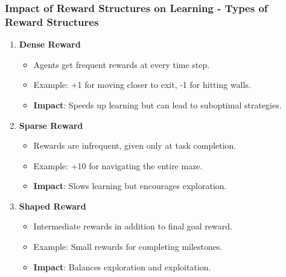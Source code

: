 \documentclass[aspectratio=169]{beamer}
\begin{document}
\begin{frame}[fragile]
    \frametitle{Impact of Reward Structures on Learning - Types of Reward Structures}
    \begin{enumerate}
        \item \textbf{Dense Reward}
        \begin{itemize}
            \item Agents get frequent rewards at every time step.
            \item Example: +1 for moving closer to exit, -1 for hitting walls.
            \item \textbf{Impact}: Speeds up learning but can lead to suboptimal strategies.
        \end{itemize}
        
        \item \textbf{Sparse Reward}
        \begin{itemize}
            \item Rewards are infrequent, given only at task completion.
            \item Example: +10 for navigating the entire maze.
            \item \textbf{Impact}: Slows learning but encourages exploration.
        \end{itemize}
        
        \item \textbf{Shaped Reward}
        \begin{itemize}
            \item Intermediate rewards in addition to final goal reward.
            \item Example: Small rewards for completing milestones.
            \item \textbf{Impact}: Balances exploration and exploitation.
        \end{itemize}
    \end{enumerate}
\end{frame}
\end{document}
